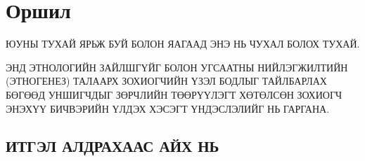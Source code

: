 \chapter*{Оршил}\normalsize
\pagestyle{plain}

ЮУНЫ ТУХАЙ ЯРЬЖ БУЙ БОЛОН ЯАГААД ЭНЭ НЬ ЧУХАЛ БОЛОХ ТУХАЙ.

ЭНД ЭТНОЛОГИЙН ЗАЙЛШГҮЙГ БОЛОН УГСААТНЫ НИЙЛЭГЖИЛТИЙН (ЭТНОГЕНЕЗ) ТАЛААРХ ЗОХИОГЧИЙН ҮЗЭЛ БОДЛЫГ ТАЙЛБАРЛАХ БӨГӨӨД УНШИГЧДЫГ ЗӨРЧЛИЙН ТӨӨРҮҮЛЭГТ ХӨТӨЛСӨН ЗОХИОГЧ ЭНЭХҮҮ БИЧВЭРИЙН ҮЛДЭХ ХЭСЭГТ ҮНДЭСЛЭЛИЙГ НЬ ГАРГАНА.

\section*{ИТГЭЛ АЛДРАХААС АЙХ НЬ}

